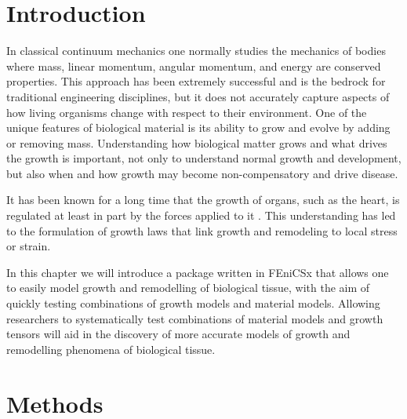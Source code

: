 \section{Introduction}
In classical continuum mechanics one normally studies the mechanics of bodies where mass, linear momentum, angular momentum, and energy are conserved properties. This approach has been extremely successful and is the bedrock for traditional engineering disciplines, but it does not accurately capture aspects of how living organisms change with respect to their environment. One of the unique features of biological material is its ability to grow and evolve by adding or removing mass. Understanding how biological matter grows and what drives the growth is important, not only to understand normal growth and development, but also when and how growth may become non-compensatory and drive disease.\par It has been known for a long time that the growth of organs, such as the heart, is regulated at least in part by the forces applied to it \citep{Hsu1968}. This understanding has led to the formulation of growth laws that link growth and remodeling to local stress or strain. \par
In this chapter we will introduce a package written in FEniCSx that allows one to easily model growth and remodelling of biological tissue, with the aim of quickly testing combinations of growth models and material models. Allowing researchers to systematically test combinations of material models and growth tensors will aid in the discovery of more accurate models of growth and remodelling phenomena of biological tissue.
\section{Methods}
